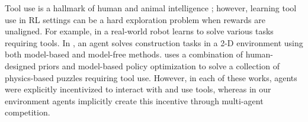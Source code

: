 Tool use is a hallmark of human and animal intelligence \citep{hunt1996manufacture, shumaker2011animal}; however, learning tool use in RL settings can be a hard exploration problem when rewards are unaligned.
For example, in \cite{forestier2017intrinsically, xie2019} a real-world robot learns to solve various tasks requiring tools. In \cite{bapst2019}, an agent solves construction tasks in a 2-D environment using both model-based and model-free methods. \cite{allen2019} uses a combination of human-designed priors and model-based policy optimization to solve a collection of physics-based puzzles requiring tool use.
However, in each of these works, agents were explicitly incentivized to interact with and use tools, whereas in our environment agents implicitly create this incentive through multi-agent competition.